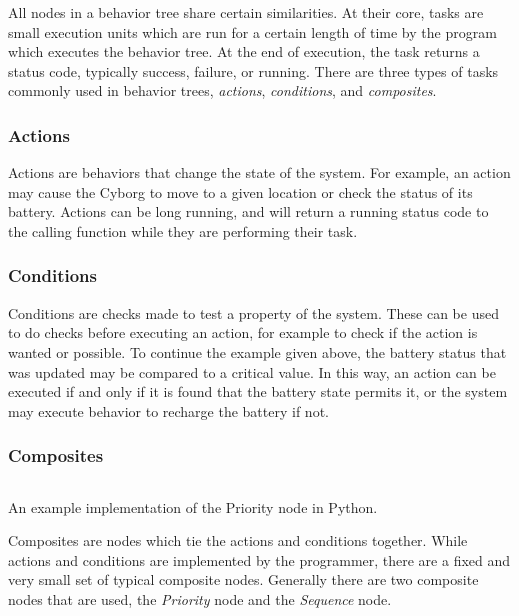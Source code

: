 \documentclass[\rootfolder/main.tex]{subfiles}
\begin{document}
All nodes in a behavior tree share certain similarities.
At their core, tasks are small execution units which are run for a certain length of time by the program which executes the behavior tree.
At the end of execution, the task returns a status code, typically success, failure, or running.
There are three types of tasks commonly used in behavior trees, \emph{actions}, \emph{conditions}, and \emph{composites}.

\subsubsection{Actions}

Actions are behaviors that change the state of the system.
For example, an action may cause the Cyborg to move to a given location or check the status of its battery.
Actions can be long running, and will return a running status code to the calling function while they are performing their task.

\subsubsection{Conditions}

Conditions are checks made to test a property of the system.
These can be used to do checks before executing an action, for example to check if the action is wanted or possible.
To continue the example given above, the battery status that was updated may be compared to a critical value.
In this way, an action can be executed if and only if it is found that the battery state permits it, or the system may execute behavior to recharge the battery if not.

\subsubsection{Composites}

\begin{listing}
    \inputminted{python}{\rootfolder/Chapters/Chapter2/Listings/priority.py}
    \caption{An example implementation of the Priority node in Python.}
    \label{lst:priority}
\end{listing}

Composites are nodes which tie the actions and conditions together.
While actions and conditions are implemented by the programmer, there are a fixed and very small set of typical composite nodes.
Generally there are two composite nodes that are used, the \emph{Priority} node and the \emph{Sequence} node.
\end{document}
